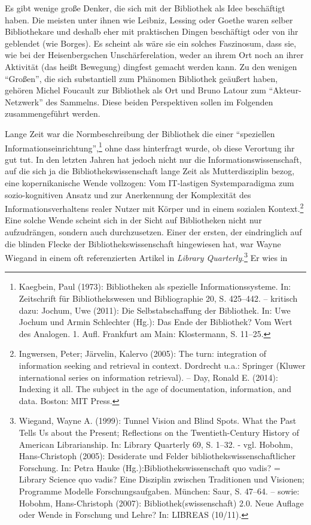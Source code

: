 \noindent Es gibt wenige große Denker, die sich mit der Bibliothek als Idee
beschäftigt haben. Die meisten unter ihnen wie Leibniz, Lessing oder
Goethe waren selber Bibliothekare und deshalb eher mit praktischen
Dingen beschäftigt oder von ihr geblendet (wie Borges). Es scheint als
wäre sie ein solches Faszinosum, dass sie, wie bei der Heisenbergschen
Unschärferelation, weder an ihrem Ort noch an ihrer Aktivität (das heißt
Bewegung) dingfest gemacht werden kann. Zu den wenigen \enquote{Großen},
die sich substantiell zum Phänomen Bibliothek geäußert haben, gehören
Michel Foucault zur Bibliothek als Ort und Bruno Latour zum
\enquote{Akteur-Netzwerk} des Sammelns. Diese beiden Perspektiven sollen
im Folgenden zusammengeführt werden.

Lange Zeit war die Normbeschreibung der Bibliothek die einer
\enquote{speziellen Informationseinrichtung},\footnote{Kaegbein, Paul
  (1973): Bibliotheken als spezielle Informationssysteme. In:
  Zeitschrift für Bibliothekswesen und Bibliographie 20, S. 425--442. --
  kritisch dazu: Jochum, Uwe (2011): Die Selbstabschaffung der
  Bibliothek. In: Uwe Jochum und Armin Schlechter (Hg.): Das Ende der
  Bibliothek? Vom Wert des Analogen. 1. Aufl. Frankfurt am Main:
  Klostermann, S. 11--25.} ohne dass hinterfragt wurde, ob diese
Verortung ihr gut tut. In den letzten Jahren hat jedoch nicht nur die
Informationswissenschaft, auf die sich ja die Bibliothekswissenschaft
lange Zeit als Mutterdisziplin bezog, eine kopernikanische Wende
vollzogen: Vom IT-lastigen Systemparadigma zum sozio-kognitiven Ansatz
und zur Anerkennung der Komplexität des Informationsverhaltens realer
Nutzer mit Körper und in einem sozialen Kontext.\footnote{Ingwersen,
  Peter; Järvelin, Kalervo (2005): The turn: integration of information
  seeking and retrieval in context. Dordrecht u.a.: Springer (Kluwer
  international series on information retrieval). -- Day, Ronald E.
  (2014): Indexing it all. The subject in the age of documentation,
  information, and data. Boston: MIT Press.} Eine solche Wende scheint
sich in der Sicht auf Bibliotheken nicht nur aufzudrängen, sondern auch
durchzusetzen. Einer der ersten, der eindringlich auf die blinden Flecke
der Bibliothekswissenschaft hingewiesen hat, war Wayne Wiegand in einem
oft referenzierten Artikel in \emph{Library Quarterly}.\footnote{Wiegand,
  Wayne A. (1999): Tunnel Vision and Blind Spots. What the Past Tells Us
  about the Present; Reflections on the Twentieth-Century History of
  American Librarianship. In: Library Quarterly 69, S. 1--32. - vgl.
  Hobohm, Hans-Christoph (2005): Desiderate und Felder
  bibliothekswissenschaftlicher Forschung. In: Petra Hauke
  (Hg.):Bibliothekswissenschaft quo vadis? = Library Science quo vadis?
  Eine Disziplin zwischen Traditionen und Visionen; Programme Modelle
  Forschungsaufgaben. München: Saur, S. 47--64. -- sowie: Hobohm,
  Hans-Christoph (2007): Bibliothek(swissenschaft) 2.0. Neue Auflage
  oder Wende in Forschung und Lehre? In: LIBREAS (10/11).} Er wies in
